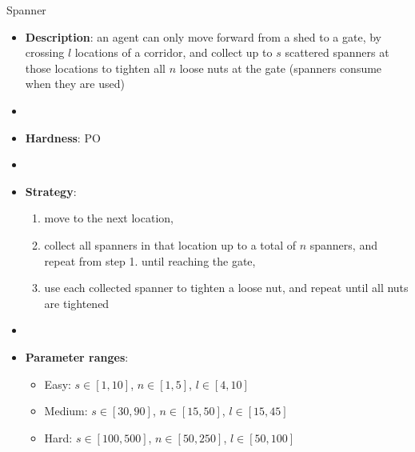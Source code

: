 \documentclass[aspectratio=169,xcolor=dvipsnames]{beamer}
\begin{document}
\begin{frame}{Spanner}

    \begin{itemize}
        \item \textbf{Description}: an agent can only move forward from a shed to a gate, by crossing $l$ locations of a corridor, and collect up to $s$ scattered spanners at those locations to tighten all $n$ loose nuts at the gate (spanners consume when they are used)
        \item[]
        \item \textbf{Hardness}: PO %
        \item[]
        \item \textbf{Strategy}:
        \begin{enumerate}
            \item move to the next location,
            \item collect all spanners in that location up to a total of $n$ spanners, and repeat from step 1. until reaching the gate,
            \item use each collected spanner to tighten a loose nut, and repeat until all nuts are tightened
        \end{enumerate}
        \item[]
        \item \textbf{Parameter ranges}:
        \begin{itemize}
            \item Easy: $s\in[1,10]$, $n\in[1, 5]$, $l\in[4, 10]$
            \item Medium: $s\in[30,90]$, $n\in[15, 50]$, $l\in[15, 45]$
            \item Hard: $s\in[100,500]$, $n\in[50, 250]$, $l\in[50, 100]$
        \end{itemize}
    \end{itemize}

\end{frame}
\end{document}
